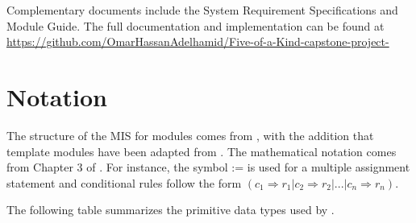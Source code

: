 \documentclass[12pt, titlepage]{article}
\begin{document}
Complementary documents include the System Requirement Specifications
and Module Guide.  The full documentation and implementation can be
found at \url{https://github.com/OmarHassanAdelhamid/Five-of-a-Kind-capstone-project-}

\section{Notation}

The structure of the MIS for modules comes from \citet{HoffmanAndStrooper1995},
with the addition that template modules have been adapted from
\cite{GhezziEtAl2003}.  The mathematical notation comes from Chapter 3 of
\citet{HoffmanAndStrooper1995}.  For instance, the symbol := is used for a
multiple assignment statement and conditional rules follow the form $(c_1
\Rightarrow r_1 | c_2 \Rightarrow r_2 | ... | c_n \Rightarrow r_n )$.

The following table summarizes the primitive data types used by \progname. 
\end{document}
